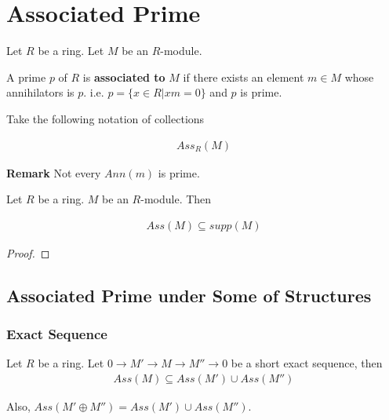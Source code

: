 \documentclass[Total.tex]{subfiles}
\begin{document}
		\section{Associated Prime}
			
			\begin{Def}
				Let $R$ be a ring. Let $M$ be an $R$-module. 
				
				A prime $p$ of $R$ is \textbf{associated to} $M$ if there exists an element $m\in M$ whose annihilators is $p$. i.e. $p=\{x\in R|xm=0\}$ and $p$ is prime. 
				
				Take the following notation of collections 
				
				\begin{gather*}
					Ass_R(M)
				\end{gather*}
			\end{Def}
			
			\textbf{Remark} Not every $Ann(m)$ is prime. 
			
			\begin{example}
				
			\end{example}
			
			\begin{lemma}
				Let $R$ be a ring. $M$ be an $R$-module. Then
				
				\begin{gather*}
					Ass(M)\subseteq supp(M)
				\end{gather*}
			\end{lemma}
			
			\begin{proof}
			\end{proof}
			
			\subsection{Associated Prime under Some of Structures}
			
			\subsubsection{Exact Sequence}
			
			\begin{lemma}
				Let $R$ be a ring. Let $0\rightarrow M'\rightarrow M\rightarrow M''\rightarrow 0$ be a short exact sequence, then
				\begin{gather*}
					Ass(M)\subseteq Ass(M')\cup Ass(M'')
				\end{gather*}
				
				Also, $Ass(M'\oplus M'')=Ass(M')\cup Ass(M'')$.
			\end{lemma}
			
\end{document}
